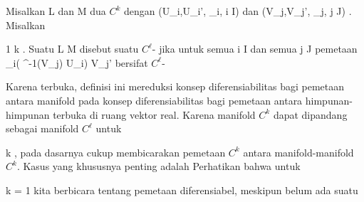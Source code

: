 
{}
{

Misalkan
\mathkor {} {L} {dan} {M} {}
dua
$C^k$ dengan
\mathkor {} {(U_i,U_i', \alpha_i, i \in I)} {dan} {(V_j,V_j', \beta_j, j \in J)} {.}
Misalkan

\mavergleichskette
{\vergleichskette
{ 1
}
{ \leq }{ \ell
}
{ \leq }{ k
}
{    }{
}
{   }{
}
}
{}{}{.}
Suatu
\maabbdisp {\varphi} { L } { M
} {}
disebut suatu $C^\ell$- jika untuk semua
\mathkor {} {i \in I} {dan semua} {j \in J} {}
pemetaan
 {\alpha_i( \varphi^{-1}(V_j) \cap U_i) } { V_j'
} {}
bersifat
$C^\ell$-

}

Karena
 terbuka, definisi ini mereduksi konsep diferensiabilitas bagi pemetaan antara manifold pada konsep diferensiabilitas bagi pemetaan antara himpunan-himpunan terbuka di ruang vektor real. Karena manifold $C^k$ dapat dipandang sebagai manifold $C^\ell$ untuk

\mavergleichskette
{\vergleichskette
{ \ell
}
{ \leq }{ k
}
{  }{
}
{    }{
}
{   }{
}
}
{}{}{}
,
pada dasarnya cukup membicarakan pemetaan $C^k$ antara manifold-manifold $C^k$. Kasus yang khususnya penting adalah
 Perhatikan bahwa untuk

\mavergleichskette
{\vergleichskette
{ k
}
{ = }{ 1
}
{  }{
}
{    }{
}
{   }{
}
}
{}{}{}
kita berbicara tentang pemetaan diferensiabel, meskipun
 {} {}
belum ada suatu 



